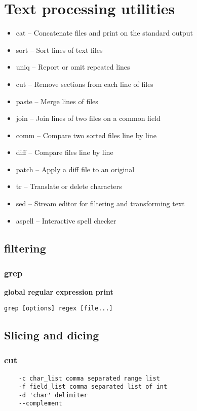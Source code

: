 \chapter{Text processing utilities}
\begin{itemize}
        \item cat – Concatenate files and print on the standard output
        \item sort – Sort lines of text files
        \item uniq – Report or omit repeated lines
        \item cut – Remove sections from each line of files
        \item paste – Merge lines of files
        \item join – Join lines of two files on a common field
        \item comm – Compare two sorted files line by line
        \item diff – Compare files line by line
        \item patch – Apply a diff file to an original
        \item tr – Translate or delete characters
        \item sed – Stream editor for filtering and transforming text
        \item aspell – Interactive spell checker
\end{itemize}

\section{filtering}
\subsection{grep}
{\bf global regular expression print}
\begin{verbatim}
grep [options] regex [file...]
\end{verbatim}

\section{Slicing and dicing}

\subsection{cut}

\begin{verbatim}
    -c char_list comma separated range list
    -f field_list comma separated list of int
    -d 'char' delimiter
    --complement
\end{verbatim}

